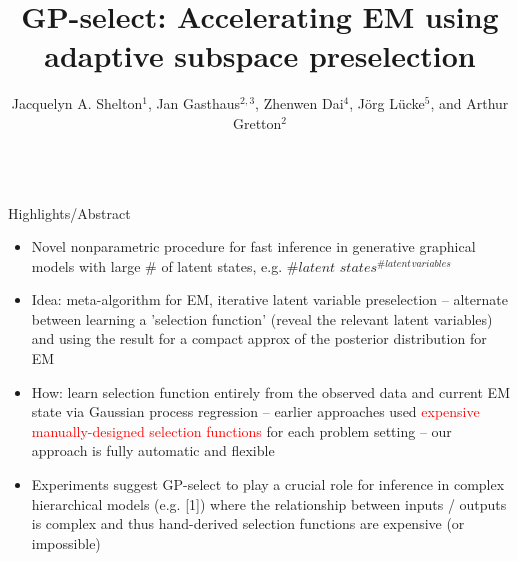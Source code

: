 \documentclass[final]{beamer}
\title[]{\huge GP-select: Accelerating EM using adaptive subspace preselection}
\author[Shelton, Gasthaus, Dai, L\"{u}cke, \& Gretton]{\Large Jacquelyn A. Shelton$^{ 1}$,  Jan Gasthaus$^{ 2,3}$, Zhenwen Dai$^{ 4}$, J\"org L\"{u}cke$^{ 5}$, and  Arthur Gretton$^{ 2}$}
\institute[TU]{\large $^{ 1}$Technical University Berlin,\quad 
$^{ 2}$UCL Gatsby and CSML,\quad 
$^{ 3}$Amazon,\quad 
$^{ 4}$University of Sheffield,\quad 
$^{ 5}$University of Oldenburg}
\newcommand{\highlight}[1]{\textcolor{blocktbgn}{#1}}
\begin{document}
\begin{frame}{} 
  \begin{columns}[t]
  \begin{column}{.33\linewidth}

    \begin{block}{Highlights/Abstract}%
            \vspace{-.4cm}  
            \begin{itemize}
            \setlength{\labelsep}{0.5em}
            \item Novel nonparametric procedure for \highlight{fast inference} in \highlight{generative graphical models with large $\#$ of latent states}, e.g. $\# latent$ $states^{\# latent}$$^{variables}$ %
            \item \highlight{Idea}: meta-algorithm for EM, \highlight{iterative latent variable preselection} -- alternate between learning a \highlight{'selection function'} (reveal the relevant latent variables) and using the result for a \highlight{compact approx of the posterior distribution for EM}
            \item \highlight{How}: \textcolor{dg}{learn selection function} entirely from the observed data and current EM state via \highlight{Gaussian process regression} -- earlier approaches used \textcolor{red}{expensive manually-designed selection functions} for each problem setting -- our approach is \textcolor{dg}{fully automatic and flexible}
            \item \highlight{Experiments} suggest GP-select to play a \textcolor{dg}{crucial role} for inference in complex hierarchical models (e.g. [1]) where the \textcolor{dg}{relationship between inputs / outputs is complex} and thus hand-derived selection functions are expensive (or impossible) %
            \end{itemize}




\end{block}
\end{column}
\end{columns}
\end{frame}
\end{document}
